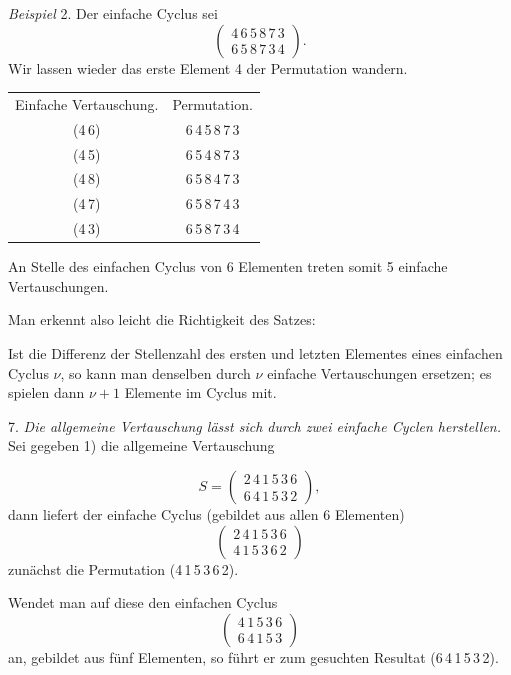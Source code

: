 \documentclass[11pt]{article}
\providecommand{\weberpage}[1]{}
\begin{document}
\textit{Beispiel} 2. Der einfache Cyclus sei
\[
\begin{pmatrix}4\,6\,5\,8\,7\,3\\6\,5\,8\,7\,3\,4\end{pmatrix}.
\]
Wir lassen wieder das erste Element 4 der Permutation wandern.

\begin{center}
\begin{tabular}{cc}
Einfache Vertauschung. & Permutation. \\
(4\,6) & 6\,4\,5\,8\,7\,3 \\
(4\,5) & 6\,5\,4\,8\,7\,3 \\
(4\,8) & 6\,5\,8\,4\,7\,3 \\
(4\,7) & 6\,5\,8\,7\,4\,3 \\
(4\,3) & 6\,5\,8\,7\,3\,4 \\
\end{tabular}
\end{center}
An Stelle des einfachen Cyclus von 6 Elementen treten somit 5 einfache
Vertauschungen.

Man erkennt also leicht die Richtigkeit des Satzes:

\glqq Ist die Differenz der Stellenzahl des ersten und letzten Elementes
eines einfachen Cyclus $\nu$, so kann man denselben durch $\nu$ einfache
Vertauschungen ersetzen; es spielen dann $\nu+1$ Elemente im Cyclus
mit.\grqq{}

7. \textit{Die allgemeine Vertauschung lässt sich durch zwei einfache
Cyclen herstellen.} Sei gegeben 1) die allgemeine Vertauschung


\weberpage{8}
\[
S=\begin{pmatrix}2\,4\,1\,5\,3\,6\\6\,4\,1\,5\,3\,2\end{pmatrix},
\]
dann liefert der einfache Cyclus (gebildet aus allen 6 Elementen)
\[
\begin{pmatrix}2\,4\,1\,5\,3\,6\\4\,1\,5\,3\,6\,2\end{pmatrix}
\]
zunächst die Permutation (4\,1\,5\,3\,6\,2).

Wendet man auf diese den einfachen Cyclus
\[
\begin{pmatrix}4\,1\,5\,3\,6\\6\,4\,1\,5\,3\end{pmatrix}
\]
an, gebildet aus fünf Elementen, so führt er zum gesuchten Resultat
(6\,4\,1\,5\,3\,2).
\end{document}
